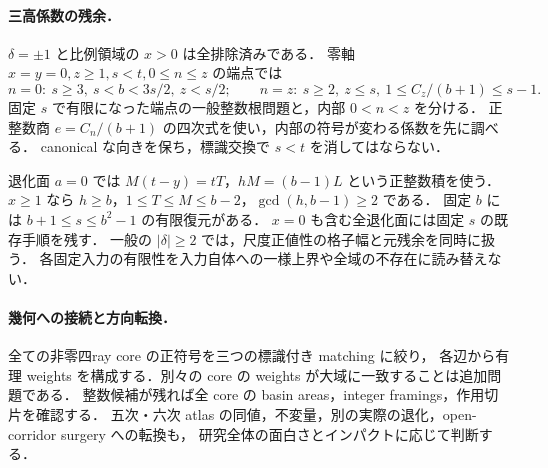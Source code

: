 \paragraph{三高係数の残余．}
$\delta=\pm1$ と比例領域の $x>0$ は全排除済みである．
零軸 $x=y=0,z\ge1,s<t,0\le n\le z$ の端点では
\[
 n=0:\ s\ge3,\ s<b<3s/2,\ z<s/2;\qquad
 n=z:\ s\ge2,\ z\le s,\ 1\le C_z/(b+1)\le s-1.
\]
固定 $s$ で有限になった端点の一般整数根問題と，内部 $0<n<z$ を分ける．
正整数商 $e=C_n/(b+1)$ の四次式を使い，内部の符号が変わる係数を先に調べる．
canonical な向きを保ち，標識交換で $s<t$ を消してはならない．

退化面 $a=0$ では $M(t-y)=tT$，$hM=(b-1)L$ という正整数積を使う．
$x\ge1$ なら $h\ge b$，$1\le T\le M\le b-2$，$\gcd(h,b-1)\ge2$ である．
固定 $b$ には $b+1\le s\le b^2-1$ の有限復元がある．
$x=0$ も含む全退化面には固定 $s$ の既存手順を残す．
一般の $|\delta|\ge2$ では，尺度正値性の格子幅と元残余を同時に扱う．
各固定入力の有限性を入力自体への一様上界や全域の不存在に読み替えない．

\paragraph{幾何への接続と方向転換．}
全ての非零四ray core の正符号を三つの標識付き matching に絞り，
各辺から有理 weights を構成する．別々の core の weights が大域に一致することは追加問題である．
整数候補が残れば全 core の basin areas，integer framings，作用切片を確認する．
五次・六次 atlas の同値，不変量，別の実際の退化，open-corridor surgery への転換も，
研究全体の面白さとインパクトに応じて判断する．
